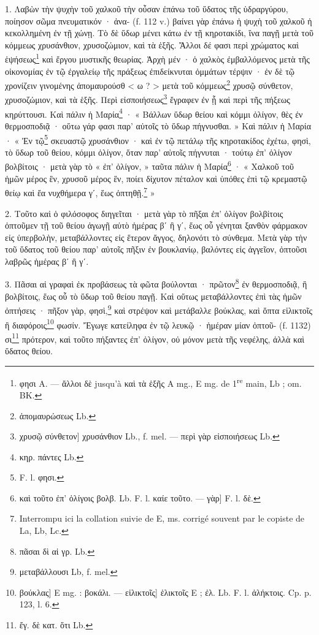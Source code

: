 \documentclass[landscape, a4paper, 11pt, oneside, polutonikogreek, french]{article}
\begin{document}
\bigskip

1. Λαβὼν τὴν ψυχὴν τοῦ χαλκοῦ τὴν οὖσαν ἐπάνω τοῦ ὕδατος τῆς ὑδραργύρου, ποίησον σῶμα πνευματικόν · ἀνα- (f. 112 v.) βαίνει γὰρ ἐπάνω ἡ ψυχὴ τοῦ χαλκοῦ ἡ κεκολλημένη ἐν τῇ χώνῃ. Τὸ δὲ ὕδωρ μένει κάτω ἐν τῇ κηροτακίδι, ἵνα παγῇ μετὰ τοῦ κόμμεως χρυσάνθιον, χρυσοζώμιον, καὶ τὰ ἑξῆς. Ἄλλοι δέ φασι περὶ χρώματος καὶ ἑψήσεως\footnote{φησι A. --- ἄλλοι δὲ jusqu'à καὶ τὰ ἑξῆς A mg., E mg. de 1\textsuperscript{re} main, Lb ; om. BK.} καὶ ἔργου μυστικῆς θεωρίας. Ἀρχὴ μέν · ὁ χαλκὸς ἐμβαλλόμενος μετὰ τῆς οἰκονομίας ἐν τῷ ἐργαλείῳ τῆς πράξεως ἐπιδείκνυται ὀμμάτων τέρψιν · ἐν δὲ τῷ χρονίζειν γινομένης ἀπομαυρούσθ < ω ? > μετὰ τοῦ κόμμεως\footnote{ἀπομαυρώσεως Lb.} χρυσῷ σύνθετον, χρυσοζώμιον, καὶ τὰ ἑξῆς. Περὶ εἰσποιήσεως\footnote{χρυσῷ σύνθετον] χρυσάνθιον Lb., f. mel. --- περὶ γὰρ εἰσποιήσεως Lb.} ἔγραφεν ἐν ᾗ καὶ περὶ τῆς πήξεως κηρύττουσι. Καὶ πάλιν ἡ Μαρία\footnote{κηρ. πάντες Lb.} · « Βάλλων ὕδωρ θείου καὶ κόμμι ὀλίγον, θὲς ἐν θερμοσποδιᾷ · οὕτω γάρ φασι παρ' αὐτοῖς τὸ ὕδωρ πήγνυσθαι. » Καὶ πάλιν ἡ Μαρία · « Ἐν τῷ\footnote{F. l. φησι.} σκευαστῷ χρυσάνθιον · καὶ ἐν τῷ πετάλῳ τῆς κηροτακίδος ἐχέτω, φησὶ, τὸ ὕδωρ τοῦ θείου, κόμμι ὀλίγον, ὅταν παρ' αὐτοῖς πήγνυται · τούτῳ ἐπ' ὀλίγον βολβίτοις · μετὰ γὰρ τὸ « ἐπ' ὀλίγον, » ταῦτα πάλιν ἡ Μαρία\footnote{καὶ τοῦτο ἐπ' ὀλίγοις βολβ. Lb. F. l. καίε τοῦτο. --- γὰρ] F. l. δὲ.} · « Χαλκοῦ τοῦ ἡμῶν μέρος ἓν, χρυσοῦ μέρος ἓν, ποίει δίχυτον πέταλον καὶ ὑπόθες ἐπὶ τῷ κρεμαστῷ θείῳ καὶ ἔα νυχθήμερα γʹ, ἕως ὀπτηθῇ.\footnote{Interrompu ici la collation suivie de E, ms. corrigé souvent par le copiste de La, Lb, Lc.} »

2. Τοῦτο καὶ ὁ φιλόσοφος διηγεῖται · μετὰ γὰρ τὸ πῆξαι ἐπ' ὀλίγον βολβίτοις ὀπτοῦμεν τῇ τοῦ θείου ἀγωγῇ αὐτὸ ἡμέρας βʹ ἢ γʹ, ἕως οὗ γένηται ξανθὸν φάρμακον εἰς ὑπερβολὴν, μεταβάλλοντες εἰς ἕτερον ἄγγος, δηλονότι τὸ σύνθεμα. Μετὰ γὰρ τὴν τοῦ ὕδατος τοῦ θείου παρ' αὐτοῖς πῆξιν ἐν βουκλανίῳ, βαλόντες εἰς ἀγγεῖον, ὀπτοῦσι λαβρῶς ἡμέρας βʹ ἢ γʹ.

3. Πᾶσαι αἱ γραφαὶ ἐκ προβάσεως τὰ φῶτα βούλονται · πρῶτον\footnote{πᾶσαι δὶ αἱ γρ. Lb.} ἐν θερμοσποδιᾷ, ἢ βολβίτοις, ἕως οὗ τὸ ὕδωρ τοῦ θείου παγῇ. Καὶ οὕτως μεταβάλλοντες ἐπὶ τὰς ἡμῶν ὀπτήσεις · πῆξον γὰρ, φησὶ,\footnote{μεταβάλλουσι Lb, f. mel.} καὶ στρέψον καὶ μετάβαλλε βούκλας, καὶ ὄπτα εἱλικτοῖς ἢ διαφόροις\footnote{βούκλας] E mg. : βοκάλι. --- εἱλικτοῖς] ἑλικτοῖς E ; ἐλ. Lb. F. l. ἀλήκτοις. Cp. p. 123, l. 6.} φωσίν. Ἔγωγε κατείληφα ἐν τῷ λευκῷ · ἡμέραν μίαν ὀπτοῦ- (f. 1132) σι\footnote{ἔγ. δὲ κατ. ὅτι Lb.} πρότερον, καὶ τοῦτο πήξαντες ἐπ' ὀλίγον, οὐ μόνον μετὰ τῆς νεφέλης, ἀλλὰ καὶ ὕδατος θείου.
\end{document}
